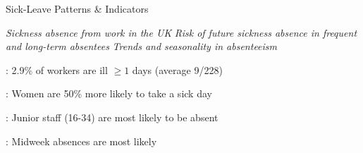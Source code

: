 \documentclass[xcolor=dvipsnames]{beamer}
\begin{document}
\begin{frame}{Sick-Leave Patterns \& Indicators}

 {
    \emph{Sickness absence from work in the UK}\cite{BarhamBegum2005}
}
 {
\emph{Risk of future sickness absence in frequent and long-term absentees}\cite{Koopmans2008}
}
 {
\emph{Trends and seasonality in absenteeism}\cite{Akyeampong2007}
}


 
 {    
    \begin{description}
        \item<2->[Incidence]: 2.9\% of workers are ill $\geq 1$ days (average 9/228)
        \item<3->[Gender]: Women are 50\% more likely to take a sick day
        \item<4->[Age]: Junior staff (16-34) are most likely to be absent
        \item<5->[Weekday]: Midweek absences are most likely
         {
        \medskip
        \tiny
        \begin{tabular}{| l | c | c | c | c | c | c | c | }

\end{tabular}}
\end{description}}
\end{frame}
\end{document}
